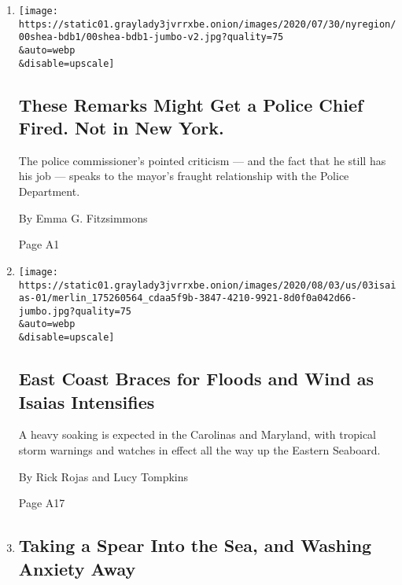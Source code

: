 \begin{enumerate}
\def\labelenumi{\arabic{enumi}.}
\item
  \href{/2020/08/03/nyregion/police-shea-de-blasio-nyc.html}{}

  \texttt{[image: https://static01.graylady3jvrrxbe.onion/images/2020/07/30/nyregion/00shea-bdb1/00shea-bdb1-jumbo-v2.jpg?quality=75\\\&auto=webp\\\&disable=upscale]}

  \hypertarget{these-remarks-might-get-a-police-chief-fired-not-in-new-york}{%
  \subsection{These Remarks Might Get a Police Chief Fired. Not in New
  York.}\label{these-remarks-might-get-a-police-chief-fired-not-in-new-york}}

  The police commissioner's pointed criticism --- and the fact that he
  still has his job --- speaks to the mayor's fraught relationship with
  the Police Department.

  By Emma G. Fitzsimmons

  Page A1
\item
  \href{/2020/08/03/us/isaias-east-coast-landfall.html}{}

  \texttt{[image: https://static01.graylady3jvrrxbe.onion/images/2020/08/03/us/03isaias-01/merlin\_175260564\_cdaa5f9b-3847-4210-9921-8d0f0a042d66-jumbo.jpg?quality=75\\\&auto=webp\\\&disable=upscale]}

  \hypertarget{east-coast-braces-for-floods-and-wind-as-isaias-intensifies}{%
  \subsection{East Coast Braces for Floods and Wind as Isaias
  Intensifies}\label{east-coast-braces-for-floods-and-wind-as-isaias-intensifies}}

  A heavy soaking is expected in the Carolinas and Maryland, with
  tropical storm warnings and watches in effect all the way up the
  Eastern Seaboard.

  By Rick Rojas and Lucy Tompkins

  Page A17
\item
  \href{/2020/08/03/world/australia/spearfishing-sydney-coronavirus.html}{}

  \hypertarget{taking-a-spear-into-the-sea-and-washing-anxiety-away}{%
  \subsection{Taking a Spear Into the Sea, and Washing Anxiety
  Away}\label{taking-a-spear-into-the-sea-and-washing-anxiety-away}}


\end{enumerate}
